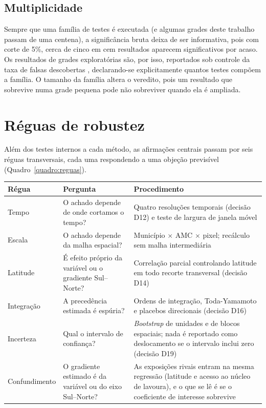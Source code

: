 \subsection{Multiplicidade}

Sempre que uma família de testes é executada (e algumas grades deste trabalho
passam de uma centena), a significância bruta deixa de ser informativa, pois com
corte de 5\%, cerca de cinco em cem resultados aparecem significativos por
acaso. Os resultados de grades exploratórias são, por isso, reportados sob
controle da taxa de falsas descobertas \cite{BenjaminiHochberg1995}, declarando-se explicitamente
quantos testes compõem a família. O tamanho da família altera o veredito, pois um
resultado que sobrevive numa grade pequena pode não sobreviver quando ela é
ampliada.

\section{Réguas de robustez}
\label{sec:met-robustez}

Além dos testes internos a cada método, as afirmações centrais passam por
seis réguas transversais, cada uma respondendo a uma objeção previsível
(Quadro~\ref{quadro:reguas}).

\begin{quadro}[htb]
\centering
\caption[Réguas de robustez das afirmações centrais]{Réguas de robustez aplicadas às afirmações centrais.}
\label{quadro:reguas}
\small
\begin{tabular}{p{2.8cm}p{4.4cm}p{6.4cm}}
\toprule
\textbf{Régua} & \textbf{Pergunta} & \textbf{Procedimento} \\
\midrule
Tempo & O achado depende de onde cortamos o tempo? &
Quatro resoluções temporais (decisão D12) e teste de largura de janela móvel \\
\addlinespace
Escala & O achado depende da malha espacial? &
Município $\times$ AMC $\times$ pixel; recálculo sem malha intermediária \\
\addlinespace
Latitude & É efeito próprio da variável ou o gradiente
Sul--Norte? &
Correlação parcial controlando latitude em todo recorte transversal
(decisão D14) \\
\addlinespace
Integração & A precedência estimada é espúria? &
Ordens de integração, Toda-Yamamoto e placebos direcionais (decisão D16) \\
\addlinespace
Incerteza & Qual o intervalo de confiança? &
\emph{Bootstrap} de unidades e de blocos espaciais; nada é reportado como
deslocamento se o intervalo inclui zero (decisão D19) \\
\addlinespace
Confundimento & O gradiente estimado é da variável ou do eixo Sul--Norte? &
As exposições rivais entram na mesma regressão (latitude e acesso ao núcleo
de lavoura), e o que se lê é se o coeficiente de interesse sobrevive \\
\bottomrule
\end{tabular}
\end{quadro}


